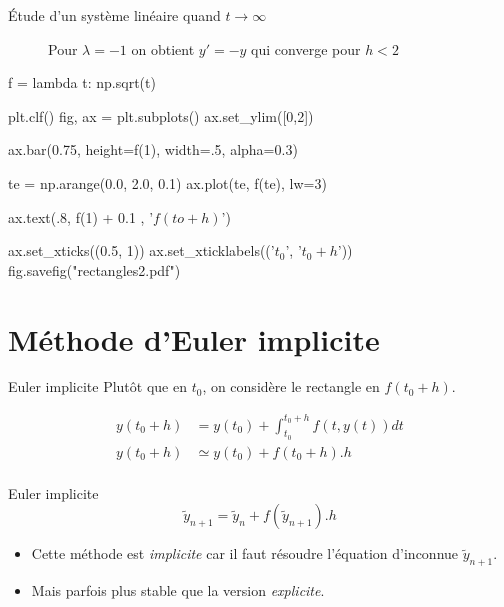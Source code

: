 \documentclass{beamer}
\begin{document}
\begin{frame}{Étude d'un système linéaire quand $t \rightarrow \infty$}
    \begin{figure}
        \caption{Pour $\lambda=-1$ on obtient $y'=-y$ qui converge pour $h<2$}
    \end{figure}
\end{frame}

\begin{pycode}
    f = lambda t: np.sqrt(t)

    plt.clf()
    fig, ax = plt.subplots()
    ax.set_ylim([0,2])

    ax.bar(0.75, height=f(1), width=.5, alpha=0.3)

    te = np.arange(0.0, 2.0, 0.1)
    ax.plot(te, f(te), lw=3)

    ax.text(.8, f(1) + 0.1 , '$f(to+h)$')

    ax.set_xticks((0.5, 1))
    ax.set_xticklabels(('$t_0$', '$t_0+h$'))
    fig.savefig("rectangles2.pdf")
\end{pycode}

\section{Méthode d'Euler implicite}

\begin{frame}{Euler implicite}
    Plutôt que en $t_0$, on considère le rectangle en $f(t_0+h)$.
    \vspace{-.25cm}
    \begin{figure}
    \end{figure}
    \vspace{-.5cm}
    \begin{align*}
        y(t_0+h) & =  y(t_0) + \int_{t_0}^{t_0+h} f(t,y(t)) dt \\
        y(t_0+h) & \simeq  y(t_0) + f(t_0 + h).h               \\
    \end{align*}
\end{frame}

\begin{frame}{Euler implicite}
    \[ \widetilde{y}_{n+1} = \widetilde{y}_n + f(\widetilde{y}_{n+1}).h \]
    \begin{itemize}
        \item Cette méthode est \emph{implicite} car il faut résoudre l'équation d'inconnue $\widetilde{y}_{n+1}$.
        \item Mais parfois plus stable que la version \emph{explicite}.
    \end{itemize}
\end{frame}
\end{document}
